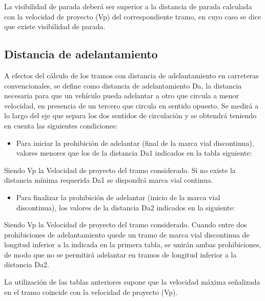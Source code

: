 \documentclass[letterpaper,10pt,english]{sphinxmanual}
\let\sphinxpxdimen\pdfpxdimen\else\newdimen\sphinxpxdimen
\begin{document}
La visibilidad de parada deberá ser superior a la distancia de parada calculada con la velocidad de proyecto (Vp) del correspondiente tramo, en cuyo caso se dice que existe visibilidad de parada.


\subsection{Distancia de adelantamiento}
\label{\detokenize{controles:distancia-de-adelantamiento}}
A efectos del cálculo de los tramos con distancia de adelantamiento en carreteras convencionales, se define como distancia de adelantamiento Da, la distancia necesaria para que un vehículo pueda adelantar a otro que circula a menor velocidad, en presencia de un tercero que circula en sentido opuesto. Se medirá a lo largo del eje que separa los dos sentidos de circulación y se obtendrá teniendo en cuenta las siguientes condiciones:
\begin{itemize}
\item {} 
Para iniciar la prohibición de adelantar (final de la marca vial discontinua), valores menores que los de la distancia Da1 indicados en la tabla siguiente:

\end{itemize}

\noindent\sphinxincludegraphics[width=800\sphinxpxdimen]{{distadel1}.png}

Siendo Vp la Velocidad de proyecto del tramo considerado. Si no existe la distancia mínima requerida Da1 se dispondrá marca vial continua.
\begin{itemize}
\item {} 
Para finalizar la prohibición de adelantar (inicio de la marca vial discontinua), los valores de la distancia Da2 indicados en la siguiente:

\end{itemize}

\noindent\sphinxincludegraphics[width=800\sphinxpxdimen]{{distadel2}.png}

Siendo Vp la Velocidad de proyecto del tramo considerado. Cuando entre dos prohibiciones de adelantamiento quede un tramo de marca vial discontinua de longitud inferior a la indicada en la primera tabla, se unirán ambas
prohibiciones, de modo que no se permitirá adelantar en tramos de longitud inferior a la distancia Da2.

La utilización de las tablas anteriores supone que la velocidad máxima señalizada en el tramo coincide con la velocidad de proyecto (Vp).
\end{document}
